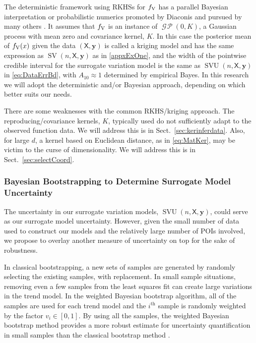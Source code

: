 \documentclass[11pt]{NSFamsart}
\DeclareMathOperator{\GP}{\mathcal{G} \! \mathcal{P}}
\DeclareMathOperator{\SVAR}{SV} %
\DeclareMathOperator{\SVARERR}{SVU} %
\newcommand{\VAR}{\textup{V}}
\newcommand{\mX}{\mathsf{X}}
\newcommand{\by}{{\boldsymbol{y}}}
\begin{document}
The deterministic framework using RKHSs for $f_{\VAR}$ has a parallel Bayesian interpretation or probabilistic numerics promoted by Diaconis \cite{Dia88a} and pursued by many others \cite{BriEtal18a, OHa91a, OwhEtal19a, RasWil06a, Rit00a}.  It assumes that $f_{\VAR}$ is an instance of $\GP(0,K)$, a Gaussian process with mean zero and covariance kernel, $K$.  In this case the posterior mean of $f_{\VAR}(x)$ given the data $(\mX,\by)$ is called a kriging model and has the same expression as $\SVAR(n,\mX,\by)$ as in \eqref{appxExOne}, and the width of the pointwise credible interval for the surrogate variation model is the same as $\SVARERR(n,\mX,\by)$ in \eqref{eq:DataErrBd}, with $A_{10} \approx 1$ determined by empirical Bayes.  In this research we will adopt the deterministic and/or Bayesian approach, depending on which better suits our needs.

There are some weaknesses with the common RKHS/kriging approach.  The reproducing/covariance kernels, $K$, typically used do not sufficiently adapt to the observed function data.  We will address this is in Sect.\ \ref{sec:kerinferdata}.  Also, for large $d$, a kernel based on Euclidean distance, as in \eqref{eq:MatKer}, may be victim to the curse of dimensionality.  We will address this is in Sect.\ \ref{sec:selectCoord}.


\subsubsection{Bayesian Bootstrapping to Determine Surrogate Model Uncertainty} \label{sec:BayesianBootUncertainty}
The uncertainty in our surrogate variation models, $\SVARERR(n,\mX,\by)$, could serve as our surrogate model uncertainty.  However, given the small number of data used to construct our models and the relatively large number of POIs involved, we propose to overlay another measure of uncertainty on top for the sake of robustness.  

In classical bootstrapping, a new sets of samples are generated by randomly selecting the existing samples, with replacement.  
In small sample situations, removing even a few samples from the least squares fit can create  large variations in the trend model. In the weighted Bayesian bootstrap algorithm, all of the samples are used for each trend model and the $i^{\text{th}}$ sample is randomly weighted by the factor $v_i \in [0,1]$. By using all the samples, the weighted Bayesian bootstrap method provides a more robust estimate for uncertainty quantification in small samples than the classical bootstrap method  \cite{rubin1981bayesian, efron1986bootstrap, efron2016computer}.    
\end{document}
